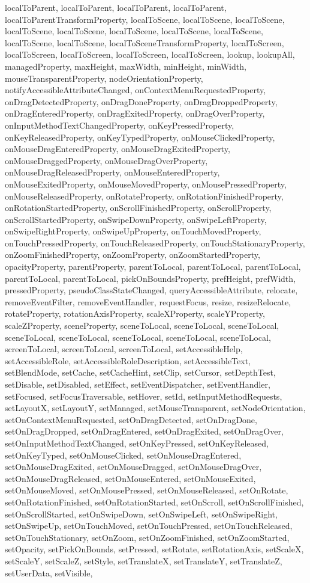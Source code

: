 {{{{{{{{{{{{{{{{{{{{{{{{{{{{{{{{{{{{{{{{{{{{{{{{{localToParent, localToParent, localToParent, localToParent, localToParentTransformProperty, localToScene, localToScene, localToScene, localToScene, localToScene, localToScene, localToScene, localToScene, localToScene, localToScene, localToSceneTransformProperty, localToScreen, localToScreen, localToScreen, localToScreen, localToScreen, lookup, lookupAll, managedProperty, maxHeight, maxWidth, minHeight, minWidth, mouseTransparentProperty, nodeOrientationProperty, notifyAccessibleAttributeChanged, onContextMenuRequestedProperty, onDragDetectedProperty, onDragDoneProperty, onDragDroppedProperty, onDragEnteredProperty, onDragExitedProperty, onDragOverProperty, onInputMethodTextChangedProperty, onKeyPressedProperty, onKeyReleasedProperty, onKeyTypedProperty, onMouseClickedProperty, onMouseDragEnteredProperty, onMouseDragExitedProperty, onMouseDraggedProperty, onMouseDragOverProperty, onMouseDragReleasedProperty, onMouseEnteredProperty, onMouseExitedProperty, onMouseMovedProperty, onMousePressedProperty, onMouseReleasedProperty, onRotateProperty, onRotationFinishedProperty, onRotationStartedProperty, onScrollFinishedProperty, onScrollProperty, onScrollStartedProperty, onSwipeDownProperty, onSwipeLeftProperty, onSwipeRightProperty, onSwipeUpProperty, onTouchMovedProperty, onTouchPressedProperty, onTouchReleasedProperty, onTouchStationaryProperty, onZoomFinishedProperty, onZoomProperty, onZoomStartedProperty, opacityProperty, parentProperty, parentToLocal, parentToLocal, parentToLocal, parentToLocal, parentToLocal, pickOnBoundsProperty, prefHeight, prefWidth, pressedProperty, pseudoClassStateChanged, queryAccessibleAttribute, relocate, removeEventFilter, removeEventHandler, requestFocus, resize, resizeRelocate, rotateProperty, rotationAxisProperty, scaleXProperty, scaleYProperty, scaleZProperty, sceneProperty, sceneToLocal, sceneToLocal, sceneToLocal, sceneToLocal, sceneToLocal, sceneToLocal, sceneToLocal, sceneToLocal, screenToLocal, screenToLocal, screenToLocal, setAccessibleHelp, setAccessibleRole, setAccessibleRoleDescription, setAccessibleText, setBlendMode, setCache, setCacheHint, setClip, setCursor, setDepthTest, setDisable, setDisabled, setEffect, setEventDispatcher, setEventHandler, setFocused, setFocusTraversable, setHover, setId, setInputMethodRequests, setLayoutX, setLayoutY, setManaged, setMouseTransparent, setNodeOrientation, setOnContextMenuRequested, setOnDragDetected, setOnDragDone, setOnDragDropped, setOnDragEntered, setOnDragExited, setOnDragOver, setOnInputMethodTextChanged, setOnKeyPressed, setOnKeyReleased, setOnKeyTyped, setOnMouseClicked, setOnMouseDragEntered, setOnMouseDragExited, setOnMouseDragged, setOnMouseDragOver, setOnMouseDragReleased, setOnMouseEntered, setOnMouseExited, setOnMouseMoved, setOnMousePressed, setOnMouseReleased, setOnRotate, setOnRotationFinished, setOnRotationStarted, setOnScroll, setOnScrollFinished, setOnScrollStarted, setOnSwipeDown, setOnSwipeLeft, setOnSwipeRight, setOnSwipeUp, setOnTouchMoved, setOnTouchPressed, setOnTouchReleased, setOnTouchStationary, setOnZoom, setOnZoomFinished, setOnZoomStarted, setOpacity, setPickOnBounds, setPressed, setRotate, setRotationAxis, setScaleX, setScaleY, setScaleZ, setStyle, setTranslateX, setTranslateY, setTranslateZ, setUserData, setVisible, }}}}}}}}}}}}}}}}}}}}}}}}}}}}}}}}}}}}}}}}}}}}}}}}}
